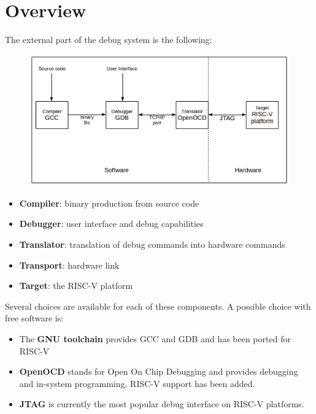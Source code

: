 \documentclass{article}
\begin{document}
	\newpage
	\section{Overview}
	
	The external part of the debug system is the following:
	
	\begin{figure}[H]
   	\centering
   	\includegraphics[width=1\textwidth]{debug-system-overview.png}
	\end{figure}
	
	\vspace{-\topsep}
	\begin{itemize}
	\item \textbf{Compiler}: binary production from source code
	\item \textbf{Debugger}: user interface and debug capabilities
	\item \textbf{Translator}: translation of debug commands into hardware commands
	\item \textbf{Transport}: hardware link
	\item \textbf{Target}: the RISC-V platform
	\end{itemize}
	
	Several choices are available for each of these components. A possible choice with free software is:
	
	\vspace{-\topsep}
	\begin{itemize}
	\item The \textbf{GNU toolchain} provides GCC and GDB and has been ported for RISC-V
	\item \textbf{OpenOCD} stands for Open On Chip Debugging and provides debugging and in-system programming. RISC-V support has been added.
	\item \textbf{JTAG} is currently the most popular debug interface on RISC-V platforms.
	\end{itemize}
	
\end{document}

